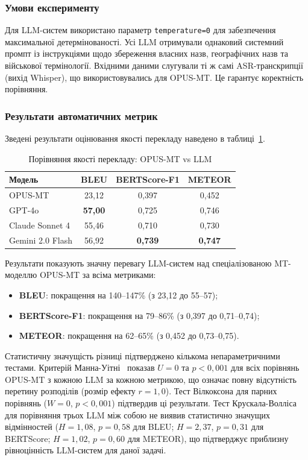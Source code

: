 \subsubsection{Умови експерименту}

Для LLM-систем використано параметр \texttt{temperature=0} для забезпечення
максимальної детермінованості. Усі LLM отримували однаковий системний промпт
із інструкціями щодо збереження власних назв, географічних назв та військової
термінології. Вхідними даними слугували ті ж самі ASR-транскрипції
(вихід Whisper), що використовувались для OPUS-MT. Це гарантує
коректність порівняння.

\subsubsection{Результати автоматичних метрик}

Зведені результати оцінювання якості перекладу наведено в таблиці~\ref{tab:llm_comparison}.

\begin{table}[H]
\centering
\caption{Порівняння якості перекладу: OPUS-MT vs LLM}
\label{tab:llm_comparison}
\begin{tabular}{|l|c|c|c|}
\hline
\textbf{Модель} & \textbf{BLEU} & \textbf{BERTScore-F1} & \textbf{METEOR} \\
\hline
OPUS-MT & 23,12 & 0,397 & 0,452 \\
GPT-4o & \textbf{57,00} & 0,725 & 0,746 \\
Claude Sonnet 4 & 55,46 & 0,710 & 0,730 \\
Gemini 2.0 Flash & 56,92 & \textbf{0,739} & \textbf{0,747} \\
\hline
\end{tabular}
\end{table}

Результати показують значну перевагу LLM-систем над спеціалізованою
MT-моделлю OPUS-MT за всіма метриками:
\begin{itemize}[nosep]
    \item \textbf{BLEU}: покращення на 140--147\% (з 23,12 до 55--57);
    \item \textbf{BERTScore-F1}: покращення на 79--86\% (з 0,397 до 0,71--0,74);
    \item \textbf{METEOR}: покращення на 62--65\% (з 0,452 до 0,73--0,75).
\end{itemize}

Статистичну значущість різниці підтверджено кількома непараметричними
тестами. Критерій Манна-Уітні~\cite{mann_whitney} показав $U = 0$ та
$p < 0,001$ для всіх порівнянь OPUS-MT з кожною LLM за кожною метрикою,
що означає повну відсутність перетину розподілів (розмір ефекту
$r = 1,0$). Тест Вілкоксона для парних порівнянь ($W = 0$, $p < 0,001$)
підтвердив ці результати. Тест Крускала-Волліса для порівняння трьох LLM
між собою не виявив статистично значущих відмінностей
($H = 1,08$, $p = 0,58$ для BLEU; $H = 2,37$, $p = 0,31$ для BERTScore;
$H = 1,02$, $p = 0,60$ для METEOR), що підтверджує приблизну рівноцінність
LLM-систем для даної задачі.


